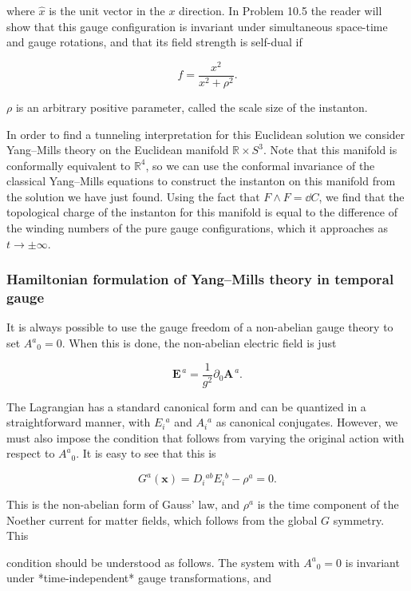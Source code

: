 where $\hat x$ is the unit vector in the $x$ direction. In Problem 10.5 the
reader will show that this gauge configuration is invariant under simultaneous
space-time and gauge rotations, and that its field strength is self-dual if

\[
  f=\frac{x^2}{x^2+\rho^2}.
\]

$\rho$ is an arbitrary positive parameter, called the scale size of the
instanton.

In order to find a tunneling interpretation for this Euclidean solution we
consider Yang--Mills theory on the Euclidean manifold $\mathbb R\times S^3$.
Note that this manifold is conformally equivalent to $\mathbb R^4$, so we can
use the conformal invariance of the classical Yang--Mills equations to construct
the instanton on this manifold from the solution we have just found. Using the
fact that $F\wedge F=\dd C$, we find that the topological charge of the
instanton for this manifold is equal to the difference of the winding numbers of
the pure gauge configurations, which it approaches as $t\to\pm\infty$.

\subsubsection{Hamiltonian formulation of Yang--Mills theory in temporal gauge}

It is always possible to use the gauge freedom of a non-abelian gauge theory to
set $A^a{}_{0}=0$. When this is done, the non-abelian electric field is just

\[
  \mathbf E^{\,a}=\frac1{g^2}\partial_0\mathbf A^{\,a}.
\]

The Lagrangian has a standard canonical form and can be quantized in a
straightforward manner, with $E_i{}^a$ and $A_i{}^a$ as canonical conjugates.
However, we must also impose the condition that follows from varying the
original action with respect to $A^a{}_{0}$. It is easy to see that this is

\[
  G^a(\mathbf x)=D_i{}^{ab}E_i{}^b-\rho^a=0.
\]

This is the non-abelian form of Gauss' law, and $\rho^a$ is the time component
of the Noether current for matter fields, which follows from the global $G$
symmetry. This

condition should be understood as follows. The system with $A^a{}_{0}=0$ is
invariant under *time-independent* gauge transformations, and

